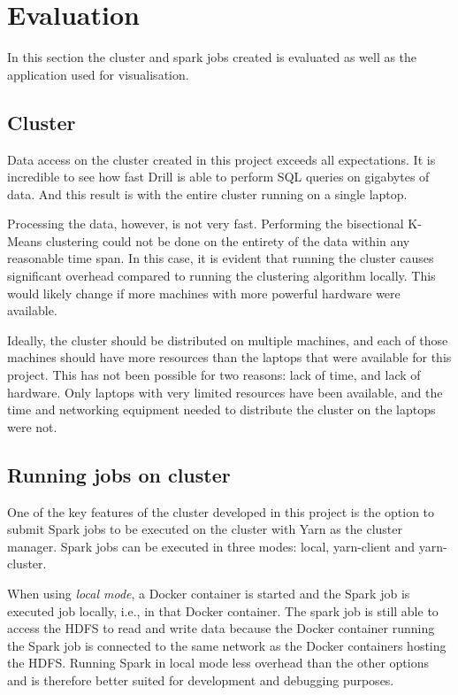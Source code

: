 \documentclass[main.tex]{subfiles}
\begin{document}
\section{Evaluation}
In this section the cluster and spark jobs created is evaluated as well as the application used for visualisation.

\subsection{Cluster}
Data access on the cluster created in this project exceeds all expectations. It is incredible to see how fast Drill is able to perform SQL queries on gigabytes of data.  And this result is with the entire cluster running on a single laptop. 

Processing the data, however, is not very fast. Performing the bisectional K-Means clustering could not be done on the entirety of the data within any reasonable time span. In this case, it is evident that running the cluster causes significant overhead compared to running the clustering algorithm locally. This would likely change if more machines with more powerful hardware were available.

Ideally, the cluster should be distributed on multiple machines, and each of those machines should have more resources than the laptops that were available for this project. This has not been possible for two reasons: lack of time, and lack of hardware. Only laptops with very limited resources have been available, and the time and networking equipment needed to distribute the cluster on the laptops were not.

\subsection{Running jobs on cluster}
One of the key features of the cluster developed in this project is the option to submit Spark jobs to be executed on the cluster with Yarn as the cluster manager. Spark jobs can be executed in three modes: local, yarn-client and yarn-cluster.

When using \textit{local mode}, a Docker container is started and the Spark job is executed job locally, i.e., in that Docker container. The spark job is still able to access the HDFS to read and write data because the Docker container running the Spark job is connected to the same network as the Docker containers hosting the HDFS. Running Spark in local mode less overhead than the other options and is therefore better suited for development and debugging purposes. 
\end{document}
